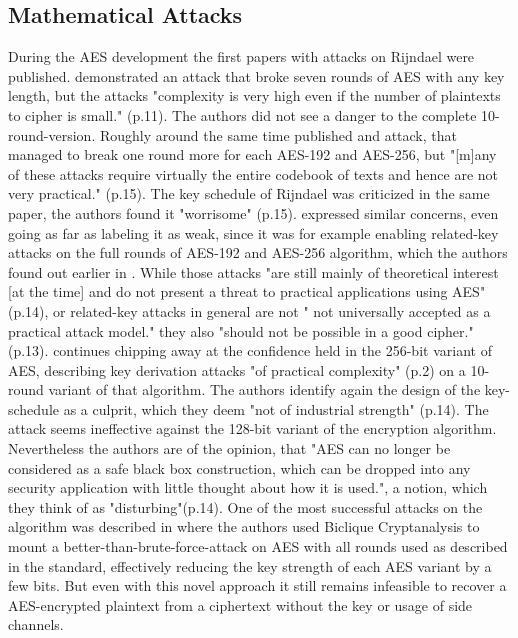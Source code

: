 \subsection{Mathematical Attacks}
\label{ch:mathematicalattacks}

During the AES development the first papers with attacks on Rijndael were published. \cite{Gilbert00acollision} demonstrated an attack that broke seven rounds of AES with any key length, but the attacks "complexity is very high even if the number of plaintexts to cipher is small." (p.11). The authors did not see a danger to the complete 10-round-version.
Roughly around the same time \cite{impcryptan} published and attack, that managed to break one round more for each AES-192 and AES-256, but "[m]any of these attacks require virtually the entire codebook of texts and hence are not very practical." (p.15).
The key schedule of Rijndael was criticized in the same paper, the authors found it "worrisome" (p.15). \cite{rkeyattack} expressed similar concerns, even going as far as labeling it as weak, since it was for example enabling related-key attacks on the full rounds of AES-192 and AES-256 algorithm, which the authors found out earlier in \cite{rkeyattack2}.  While those attacks "are still mainly of theoretical interest [at the time] and do not present a threat to practical applications using AES" (p.14), or related-key attacks in general are not " not universally accepted as a practical attack model."\cite[p. 14]{rkeyattack3} they also "should not be possible in a good cipher." \cite{rkeyattack} (p.13).
\cite{rkeyattack3} continues chipping away at the confidence held in the 256-bit variant of AES, describing key derivation attacks "of practical complexity" (p.2) on a 10-round variant of that algorithm. The authors identify again the design of the key-schedule as a culprit, which they deem "not of industrial strength" (p.14). The attack seems ineffective against the 128-bit variant of the encryption algorithm. Nevertheless the authors are of the opinion, that "AES can no longer be considered as a safe black box construction, which can be dropped into any security application with little thought about how it is used.", a notion, which they think of as "disturbing"(p.14).
One of the most successful attacks on the algorithm was described in \cite{biclique} where the authors used Biclique Cryptanalysis to mount a better-than-brute-force-attack on AES with all rounds used as described in the standard, effectively reducing the key strength of each AES variant by a few bits. But even with this novel approach it still remains infeasible to recover a AES-encrypted plaintext from a ciphertext without the key or usage of side channels.



